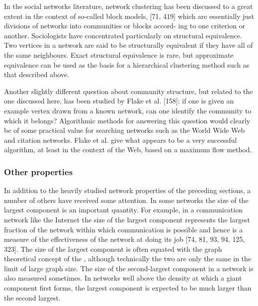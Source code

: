    
      In the social networks literature, network clustering has been discussed to a great extent in the context of so-called block models, [71, 419] which are essentially just divisions of networks into communities or blocks accord- ing to one criterion or another. Sociologists have concentrated particularly on structural equivalence. Two vertices in a network are said to be structurally equivalent if they have all of the same neighbours. Exact structural equivalence is rare, but approximate equivalence can be used as the basis for a hierarchical clustering method such as that described above.
      
      Another slightly different question about community structure, but related to the one discussed here, has been studied by Flake et al. [158]: if one is given an example vertex drawn from a known network, can one identify the community to which it belongs? Algorithmic methods for answering this question would clearly be of some practical value for searching networks such as the World Wide Web and citation networks. Flake et al. give what appears to be a very successful algorithm, at least in the context of the Web, based on a maximum flow method.
      
    \subsubsection{Other properties}
    
      In addition to the heavily studied network properties of the preceding sections, a number of others have received some attention. In some networks the size of the largest component is an important quantity. For example, in a communication network like the Internet the size of the largest component represents the largest fraction of the network within which communication is possible and hence is a measure of the effectiveness of the network at doing its job [74, 81, 93, 94, 125, 323]. The size of the largest component is often equated with the graph theoretical concept of the , although technically the two are only the same in the limit of large graph size. The size of the second-largest component in a network is also measured sometimes. In networks well above the density at which a giant component first forms, the largest component is expected to be much larger than the second largest.
      
